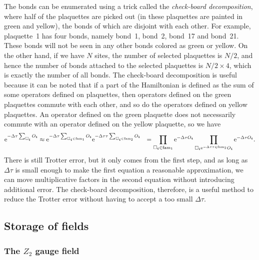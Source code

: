 \documentclass[hyperref, a4paper]{article}
\newcommand*{\ee}{\mathrm{e}}
\newcommand*{\Ztwo}{\texorpdfstring{$\mathbb{Z}_2$ }{Z2 }}
\def\\{}%
\def\mathbb#1{#1}%
\begin{document}
The bonds can be enumerated using a trick called the \emph{check-board decomposition}, 
where half of the plaquettes are picked out
(in  these plaquettes are painted in green and yellow), 
the bonds of which are disjoint with each other.
For example, plaquette~1 has four bonds, namely bond~1, bond~2, bond~17 and bond~21.
These bonds will not be seen in any other bonds colored as green or yellow.
On the other hand, if we have $N$ sites, the number of selected plaquettes is $N/2$, 
and hence the number of bonds attached to the selected plaquettes is $N/2 \times 4$, which is exactly the number of all bonds.
The check-board decomposition is useful because it can be noted that if a part of the Hamiltonian is defined as the sum of some operators defined on plaquettes, 
then operators defined on the green plaquettes commute with each other, and so do the operators defined on yellow plaquettes.
An operator defined on the green plaquette does not necessarily commute with an operator defined on the yellow plaquette,
so we have 
\begin{equation}
    \begin{aligned}
        \ee^{-\Delta \tau \sum_{\Box_{\vb*{i}}} O_{\vb*{i}}} &\approx \ee^{- \Delta \tau \sum_{\Box_{\vb*{i}} \in \mathrm{fam}_1} O_{\vb*{i}}} \ee^{- \Delta \tau \tau \sum_{\Box_{\vb*{i}} \in \mathrm{fam}_2} O_{\vb*{i}}}  \\
        &= \prod_{\Box_{\vb*{i}} \in \mathrm{fam}_1} \ee^{- \Delta \tau O_{\vb*{i}}} \prod_{\Box_{\vb*{i}} \ee^{- \Delta \tau \tau \in \mathrm{fam}_2} O_{\vb*{i}}} \ee^{- \Delta \tau O_{\vb*{i}}}.
    \end{aligned}
\end{equation}
There is still Trotter error, but it only comes from the first step, and as long as $\Delta \tau$ is small enough to make the first equation a reasonable approximation, we can move multiplicative factors in the second equation without introducing additional error.
The check-board decomposition, therefore, is a useful method to reduce the Trotter error without having to accept a too small $\Delta \tau$.

\subsection{Storage of fields}

\subsubsection{The \Ztwo gauge field}
\end{document}
